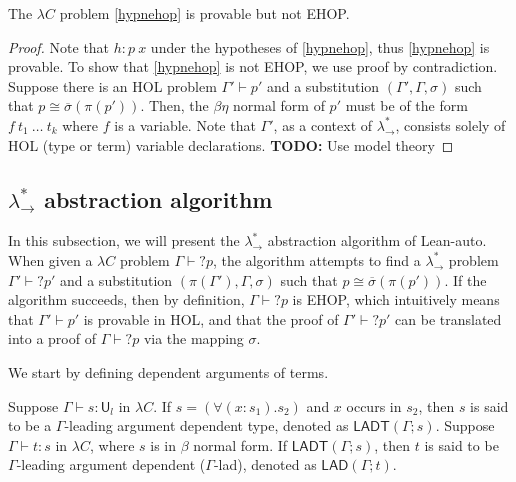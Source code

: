 \begin{theorem}
  The $\lambda C$ problem \eqref{hypnehop} is provable but not EHOP.
\end{theorem}
\begin{proof}
  Note that $h : p \ x$ under the hypotheses of \eqref{hypnehop}, thus \eqref{hypnehop} is provable.
  To show that \eqref{hypnehop} is not EHOP, we use proof by contradiction. Suppose there
  is an HOL problem $\Gamma' \vdash p'$ and a substitution $(\Gamma', \Gamma, \sigma)$ such
  that $p \cong \overline{\sigma}(\pi(p'))$. Then, the $\beta\eta$ normal form of $p'$ must be of the form
  $f \ t_1 \ \dots \ t_k$ where $f$ is a variable. Note that $\Gamma'$, as a context of $\lambda_\to^*$,
  consists solely of HOL (type or term) variable declarations. \textbf{TODO:} Use model theory
\end{proof}

\subsection{$\lambda_\to^*$ abstraction algorithm}

In this subsection, we will present the $\lambda_\to^*$ abstraction algorithm of Lean-auto. When given a
$\lambda C$ problem $\Gamma \vdash? p$, the algorithm attempts to find a $\lambda_\to^*$
problem $\Gamma' \vdash? p'$ and a substitution $(\pi(\Gamma'), \Gamma, \sigma)$ such that
$p \cong \overline{\sigma}(\pi(p'))$. If the algorithm succeeds, then by definition, $\Gamma \vdash? p$
is EHOP, which intuitively means that $\Gamma' \vdash p'$ is provable in HOL, and that the
proof of $\Gamma' \vdash? p'$ can be translated into a proof of $\Gamma \vdash? p$ via
the mapping $\sigma$.

We start by defining dependent arguments of terms.

\begin{definition} Suppose $\Gamma \vdash s : \mathsf{U}_l$ in $\lambda C$.
  If $s = (\forall (x : s_1). s_2)$ and $x$ occurs in $s_2$,
  then $s$ is said to be a $\Gamma$-leading argument dependent type,
  denoted as $\mathsf{LADT}(\Gamma; s)$. Suppose $\Gamma \vdash t : s$ in $\lambda C$, where $s$
  is in $\beta$ normal form. If $\mathsf{LADT}(\Gamma; s)$, then $t$ is said to be
  $\Gamma$-leading argument dependent ($\Gamma$-lad), denoted as $\mathsf{LAD}(\Gamma; t)$.
\end{definition}

